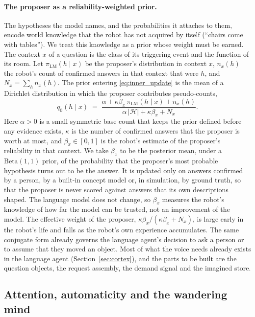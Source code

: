 \paragraph{The proposer as a reliability-weighted prior.}
The hypotheses the model names, and the probabilities it attaches to them, encode world knowledge that the robot has
not acquired by itself (``chairs come with tables''). We treat this knowledge as a prior whose weight must be earned.
The context $x$ of a question is the class of its triggering event and the function of its room. Let $\pi_{\text{LM}}(h \mid x)$ be the proposer's distribution in context $x$, $n_x(h)$ the robot's count
of confirmed answers in that context that were $h$, and $N_x = \sum_h n_x(h)$. The prior entering
\eqref{eq:inner_update} is the mean of a Dirichlet distribution in which the proposer contributes pseudo-counts,
\begin{equation}
    q_0(h \mid x) \;=\; \frac{\alpha + \kappa\beta_x\,\pi_{\text{LM}}(h \mid x) + n_x(h)}
    {\alpha\,|\mathcal{H}| + \kappa\beta_x + N_x}.
    \label{eq:inner_prior}
\end{equation}
Here $\alpha > 0$ is a small symmetric base count that keeps the prior defined before any evidence exists, $\kappa$
is the number of confirmed answers that the proposer is worth at most, and $\beta_x \in [0,1]$ is the robot's
estimate of the proposer's reliability in that context. We take $\beta_x$ to be the posterior mean, under a
$\mathrm{Beta}(1,1)$ prior, of the probability that the proposer's most probable hypothesis turns out to be
the answer. It is updated only on answers confirmed by a person, by a built-in concept model or, in simulation, by
ground truth, so that the proposer is never scored against answers that its own descriptions shaped. The language
model does not change, so $\beta_x$ measures the robot's knowledge of how far the model can be trusted, not an
improvement of the model. The effective weight of the proposer, $\kappa\beta_x / (\kappa\beta_x + N_x)$, is large
early in the robot's life and falls as the robot's own experience accumulates. The same conjugate form already
governs the language agent's decision to ask a person or to assume that they moved an object. Most of what the voice
needs already exists in the language agent (Section~\ref{sec:cortex}), and the parts to be built are the question
objects, the request assembly, the demand signal and the imagined store.

\subsection{Attention, automaticity and the wandering mind}
\label{sec:inner_speech:modes}

